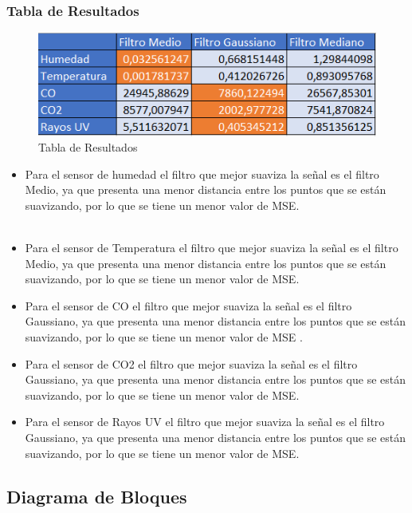 \documentclass[10pt,a4paper]{article}
\begin{document}
\begin{multicols}{2}
\begin{itemize}
\subsubsection{Tabla de Resultados}
\begin{figure}[H]
\centering
\includegraphics[scale=0.9]{result.PNG}
\caption{Tabla de Resultados}
\end{figure}
\begin{itemize}
\renewcommand{\labelitemi}{$-$}

\item Para el sensor de humedad el filtro que mejor suaviza la señal es el filtro Medio, ya que presenta una menor distancia entre los puntos que se están suavizando, por lo que se tiene un menor valor de MSE.\\
\\
\item Para el sensor de Temperatura el filtro que mejor suaviza la señal es el filtro Medio, ya que presenta una menor distancia entre los puntos que se están suavizando, por lo que se tiene un menor valor de MSE.\\
\item Para el sensor de CO el filtro que mejor suaviza la señal es el filtro Gaussiano, ya que presenta una menor distancia entre los puntos que se están suavizando, por lo que se tiene un menor valor de MSE .
\item Para el sensor de CO2 el filtro que mejor suaviza la señal es el filtro Gaussiano, ya que presenta una menor distancia entre los puntos que se están suavizando, por lo que se tiene un menor valor de MSE.
\item Para el sensor de Rayos UV el filtro que mejor suaviza la señal es el filtro Gaussiano, ya que presenta una menor distancia entre los puntos que se están suavizando, por lo que se tiene un menor valor de MSE.
\end{itemize}

\subsection{Diagrama de Bloques}


\end{itemize}
\end{multicols}
\end{document}
